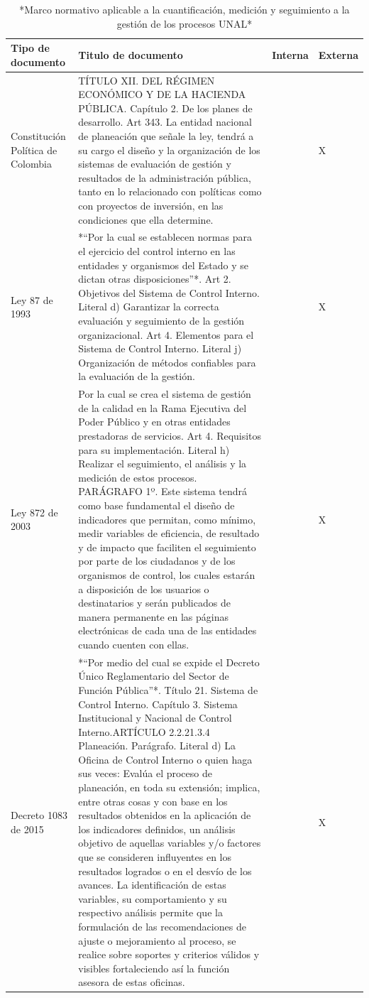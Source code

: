 \documentclass[
]{book}
\begin{document}
\begin{table}

\caption{\label{tab:unnamed-chunk-3}*Marco normativo aplicable a la cuantificación, medición y seguimiento a la gestión de los procesos UNAL*}
\centering
\begin{tabular}[t]{l|l|l|l}
\hline
Tipo de documento & Titulo de documento & Interna & Externa\\
\hline
Constitución Política de Colombia & TÍTULO XII. DEL RÉGIMEN ECONÓMICO Y DE LA HACIENDA PÚBLICA. Capítulo 2. De los planes de desarrollo. Art 343. La entidad nacional de planeación que señale la ley, tendrá a su cargo el diseño y la organización de los sistemas de evaluación de gestión y resultados de la administración pública, tanto en lo relacionado con políticas como con proyectos de inversión, en las condiciones que ella determine. &  & X\\
\hline
Ley 87 de 1993 & *“Por la cual se establecen normas para el ejercicio del control interno en las entidades y organismos del Estado y se dictan otras disposiciones”*. Art 2. Objetivos del Sistema de Control Interno. Literal d) Garantizar la correcta evaluación y seguimiento de la gestión organizacional. Art 4. Elementos para el Sistema de Control Interno. Literal j) Organización de métodos confiables para la evaluación de la gestión. &  & X\\
\hline
Ley 872 de 2003 & Por la cual se crea el sistema de gestión de la calidad en la Rama Ejecutiva del Poder Público y en otras entidades prestadoras de servicios. Art 4. Requisitos para su implementación. Literal h) Realizar el seguimiento, el análisis y la medición de estos procesos. PARÁGRAFO 1º. Este sistema tendrá como base fundamental el diseño de indicadores que permitan, como mínimo, medir variables de eficiencia, de resultado y de impacto que faciliten el seguimiento por parte de los ciudadanos y de los organismos de control, los cuales estarán a disposición de los usuarios o destinatarios y serán publicados de manera permanente en las páginas electrónicas de cada una de las entidades cuando cuenten con ellas. &  & X\\
\hline
Decreto 1083 de 2015 & *“Por medio del cual se expide el Decreto Único Reglamentario del Sector de Función Pública”*. Título 21. Sistema de Control Interno. Capítulo 3. Sistema Institucional y Nacional de Control Interno.ARTÍCULO 2.2.21.3.4 Planeación. Parágrafo. Literal d) La Oficina de Control Interno o quien haga sus veces: Evalúa el proceso de planeación, en toda su extensión; implica, entre otras cosas y con base en los resultados obtenidos en la aplicación de los indicadores definidos, un análisis objetivo de aquellas variables y/o factores que se consideren influyentes en los resultados logrados o en el desvío de los avances. La identificación de estas variables, su comportamiento y su respectivo análisis permite que la formulación de las recomendaciones de ajuste o mejoramiento al proceso, se realice sobre soportes y criterios válidos y visibles fortaleciendo así la función asesora de estas oficinas. &  & X\\

\end{tabular}
\end{table}
\end{document}
